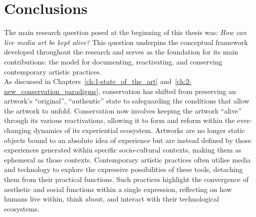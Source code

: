 
\chapter*{\label{ch:conclusions}Conclusions}

The main research question posed at the beginning of this thesis was: \textit{How can live media art be kept alive?} This question underpins the conceptual framework developed throughout the research and serves as the foundation for its main contributions: the model for documenting, reactivating, and conserving contemporary artistic practices.\\
As discussed in Chapters~\ref{ch:1-state_of_the_art} and~\ref{ch:2-new_conservation_paradigms}, conservation has shifted from preserving an artwork's ``original'', ``authentic'' state to safeguarding the conditions that allow the artwork to unfold. Conservation now involves keeping the artwork ``alive'' through its various reactivations, allowing it to form and reform within the ever-changing dynamics of its experiential ecosystem. Artworks are no longer static objects bound to an absolute idea of experience but are instead defined by those experiences generated within specific socio-cultural contexts, making them as ephemeral as those contexts. Contemporary artistic practices often utilise media and technology to explore the expressive possibilities of these tools, detaching them from their practical functions. Such practices highlight the convergence of aesthetic and social functions within a single expression, reflecting on how humans live within, think about, and interact with their technological ecosystems.\\
